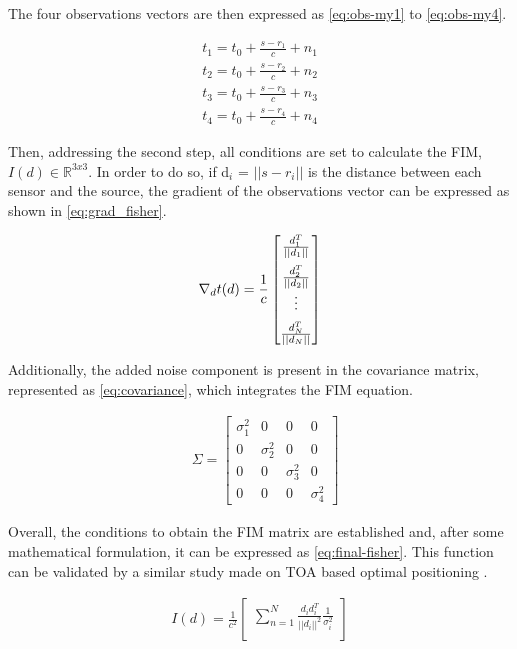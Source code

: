 The four observations vectors are then expressed as \ref{eq:obs-my1} to \ref{eq:obs-my4}.

\begin{eqnarray}
	t_1 = t_0 + \frac{s - r_1}{c} + n_1 
	\label{eq:obs-my1} \\
	t_2 = t_0 + \frac{s - r_2}{c} + n_2
	\label{eq:obs-my2} \\
	t_3 = t_0 + \frac{s - r_3}{c} + n_3
	\label{eq:obs-my3} \\
	t_4 = t_0 + \frac{s - r_4}{c} + n_4 
	\label{eq:obs-my4}
\end{eqnarray}

Then, addressing the second step, all conditions are set to calculate the FIM,  $I(d) \in \mathbb{R}^{3x3}$. In order to do so, if d$_{i}$ = $|| s - r_{i} ||$ is the distance between each sensor and the source, the gradient of the observations vector can be expressed as shown in \ref{eq:grad_fisher}.

\begin{eqnarray}
	\nabla_{d}t(d) = \frac{1}{c} 
	\begin{bmatrix}
		\frac{d_1^T}{||d_1||} \\ 
		\addlinespace
		\frac{d_2^T}{||d_2||} \\
		\vdots \\
		\addlinespace
		\frac{d_N^T}{||d_N||}
	\end{bmatrix}
	\label{eq:grad_fisher}
\end{eqnarray}

Additionally, the added noise component is present in the covariance matrix, represented as \ref{eq:covariance}, which integrates the FIM equation.

\begin{eqnarray}
	& \Sigma = 
	\begin{bmatrix}
		\sigma_1^2 & 0 & 0 & 0 \\
		0 & \sigma_2^2 & 0 & 0 \\
		0 & 0  & \sigma_3^2  & 0 \\
		0 & 0 & 0 & \sigma_4^2 
	\end{bmatrix}
	\label{eq:covariance}
\end{eqnarray}

Overall, the conditions to obtain the FIM matrix are established and, after some mathematical formulation, it can be expressed as \ref{eq:final-fisher}. This function can be validated by a similar study made on TOA based optimal positioning \cite{cramer-bruno}.

\begin{eqnarray}
	I(d) = \frac{1}{c^2} 
	\begin{bmatrix}
		\sum_{n=1}^{N} \frac{d_i d_i^T}{||d_i||^2} \frac{1}{\sigma_i^2}\\
	\end{bmatrix}
	\label{eq:final-fisher}
\end{eqnarray}

